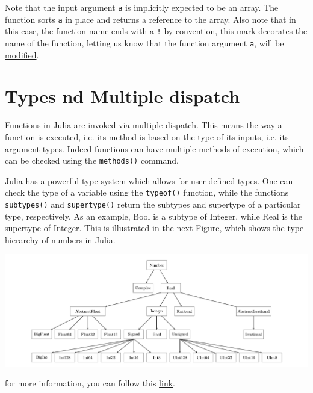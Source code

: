 \documentclass[11pt]{article}
\begin{document}
Note that the input argument \texttt{a} is implicitly expected to be an array. The function sorts \texttt{a} in place and returns a reference to the array. Also note that in this case, the function-name ends with a \texttt{!} by convention, this mark decorates the name of the function, letting us know that the function argument \texttt{a}, will be \uline{modified}.

\section{Types nd Multiple dispatch}
\label{sec:org339e8de}

Functions in Julia are invoked via multiple dispatch. This means the way a function is executed, i.e. its method is based on the type of its inputs, i.e. its argument types. Indeed functions can have multiple methods of execution, which can be checked using the \texttt{methods()} command.

Julia has a powerful type system which allows for user-defined types. One can check the type of a variable using the \texttt{typeof()} function, while the functions \texttt{subtypes()} and \texttt{supertype()} return the subtypes and supertype of a particular type, respectively. As an example, Bool is a subtype of Integer, while Real is the supertype of Integer. This is illustrated in the next Figure, which shows the type hierarchy of numbers in Julia.

\begin{center}
\includegraphics[width=.9\linewidth]{julia.png}
\end{center}

for more information, you can follow this \href{https://docs.julialang.org/en/v1/base/numbers/}{link}.
\end{document}
